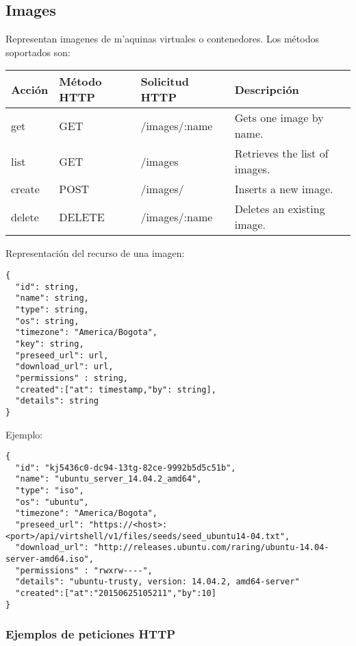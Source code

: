 \subsection{Images}
Representan imagenes de m'aquinas virtuales o contenedores. Los métodos soportados son:

\begin{center}
 \begin{tabular}{| l | l | l | l |}
 \hline
  \rowcolor{blueapi}
  \textbf{Acción} & \textbf{Método HTTP} & \textbf{Solicitud HTTP} & \textbf{Descripción} \\ [0.5ex] 
  \hline\hline
  get & GET & /images/:name & Gets one image by name. \\
  \hline
  list & GET & /images & Retrieves the list of images. \\
  \hline  
  create & POST & /images/ & Inserts a new image. \\
  \hline
  delete & DELETE & /images/:name & Deletes an existing image. \\ [1ex] 
  \hline
\end{tabular}
\end{center}

\vspace{1cm}
Representación del recurso de una imagen:
\vspace{1cm}

\begin{lstlisting}[style=json]
{
  "id": string,
  "name": string,
  "type": string,
  "os": string,
  "timezone": "America/Bogota", 
  "key": string,
  "preseed_url": url,
  "download_url": url,
  "permissions" : string,
  "created":["at": timestamp,"by": string],
  "details": string
}
\end{lstlisting}

Ejemplo:

\medskip
\begin{lstlisting}[style=json]
{
  "id": "kj5436c0-dc94-13tg-82ce-9992b5d5c51b",
  "name": "ubuntu_server_14.04.2_amd64",
  "type": "iso",
  "os": "ubuntu",
  "timezone": "America/Bogota",
  "preseed_url": "https://<host>:<port>/api/virtshell/v1/files/seeds/seed_ubuntu14-04.txt",
  "download_url": "http://releases.ubuntu.com/raring/ubuntu-14.04-server-amd64.iso",
  "permissions" : "rwxrw----",
  "details": "ubuntu-trusty, version: 14.04.2, amd64-server"
  "created":["at":"20150625105211","by":10]
}
\end{lstlisting}

\subsubsection{Ejemplos de peticiones HTTP}

